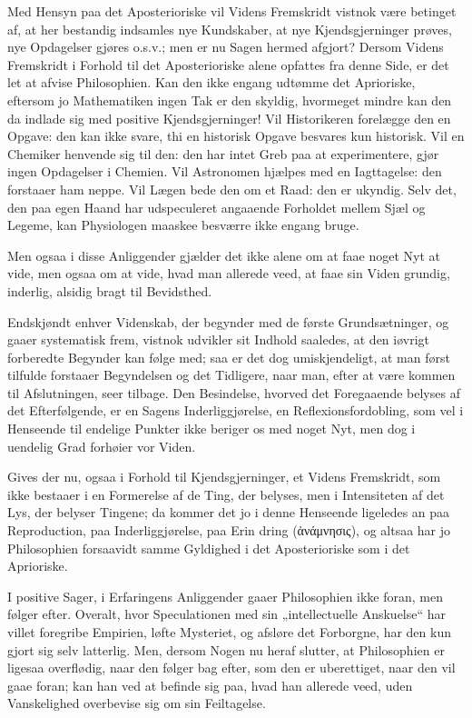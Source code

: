 \documentclass[12pt]{book}
\newcommand{\opage}[1]{\marginnote{\footnotesize\textit{[#1]}}}
\begin{document}
Med Hensyn paa det Aposterioriske vil Videns Fremskridt vistnok være betinget af, at her
bestandig indsamles nye Kundskaber, at nye Kjendsgjerninger prøves, nye Opdagelser gjøres
o.s.v.; men er nu Sagen hermed afgjort?
\opage{100} Dersom Videns Fremskridt i Forhold til det Aposterioriske alene opfattes fra denne Side, er
det let at afvise Philosophien. Kan den ikke engang udtømme det Aprioriske, eftersom jo
Mathematiken ingen Tak er den skyldig, hvormeget mindre kan den da indlade sig med positive
Kjendsgjerninger! Vil Historikeren forelægge den en Opgave: den kan ikke svare, thi en
historisk Opgave besvares kun historisk. Vil en Chemiker henvende sig til den: den har
intet Greb paa at experimentere, gjør ingen Opdagelser i Chemien. Vil Astronomen hjælpes
med en Iagttagelse: den forstaaer ham neppe. Vil Lægen bede den om et Raad: den er ukyndig.
Selv det, den paa egen Haand har udspeculeret angaaende Forholdet mellem Sjæl og Legeme,
kan Physiologen maaskee besværre ikke engang bruge.

Men ogsaa i disse Anliggender gjælder det ikke alene om at faae noget Nyt at vide, men
ogsaa om at vide, hvad man allerede veed, at faae sin Viden grundig, inderlig, alsidig
bragt til Bevidsthed.

Endskjøndt enhver Videnskab, der begynder med de første Grundsætninger, og gaaer
systematisk frem, vistnok udvikler sit Indhold saaledes, at den iøvrigt forberedte Begynder
kan følge med; saa er det dog umiskjendeligt, at man først tilfulde forstaaer Begyndelsen
og det Tidligere, naar man, efter at være kommen til Afslutningen, seer tilbage. Den
Besindelse, hvorved det Foregaaende belyses af det Efterfølgende, er en Sagens
Inderliggjørelse, en Reflexionsfordobling, som vel i Henseende til endelige Punkter ikke
beriger os med noget Nyt, men dog i uendelig Grad forhøier vor Viden.

Gives der nu, ogsaa i Forhold til Kjendsgjerninger, et Videns Fremskridt, som ikke bestaaer
i en Formerelse af de Ting, der belyses, men i Intensiteten af det Lys, der belyser
Tingene; da kommer det jo i denne Henseende ligeledes an paa Reproduction, paa
Inderliggjørelse, paa Erin%
\opage{101}dring (ἀνάμνησις), og altsaa har jo Philosophien forsaavidt samme Gyldighed i det
Aposterioriske som i det Aprioriske.

I positive Sager, i Erfaringens Anliggender gaaer Philosophien ikke foran, men følger
efter. Overalt, hvor Speculationen med sin „intellectuelle Anskuelse“ har villet foregribe
Empirien, løfte Mysteriet, og afsløre det Forborgne, har den kun gjort sig selv latterlig.
Men, dersom Nogen nu heraf slutter, at Philosophien er ligesaa overflødig, naar den følger
bag efter, som den er uberettiget, naar den vil gaae foran; kan han ved at befinde sig paa,
hvad han allerede veed, uden Vanskelighed overbevise sig om sin Feiltagelse.
\end{document}
